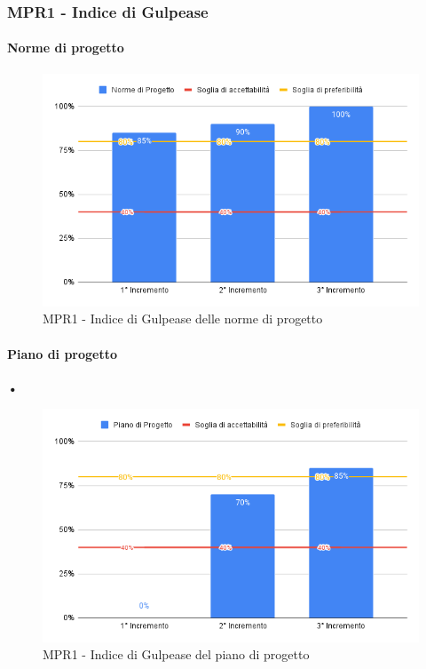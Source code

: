 \subsubsection{MPR1 - Indice di Gulpease}

\paragraph{Norme di progetto} \aCapo{}

\begin{figure}[H]
	\centering
	\includegraphics[scale = 0.6]{sezioni/Images/NdP.png}
	\caption{MPR1 - Indice di Gulpease delle norme di progetto}
\end{figure}

\paragraph{Piano di progetto} \textbf{•}

\begin{figure}[H]
	\centering
	\includegraphics[scale = 0.6]{sezioni/Images/PdP.png}
	\caption{MPR1 - Indice di Gulpease del piano di progetto}
\end{figure}

